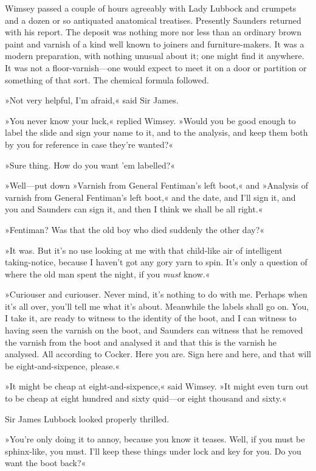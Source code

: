 Wimsey passed a couple of hours agreeably with Lady Lubbock and crumpets and a dozen or so antiquated anatomical treatises. Presently Saunders returned with his report. The deposit was nothing more nor less than an ordinary brown paint and varnish of a kind well known to joiners and furniture-makers. It was a modern preparation, with nothing unusual about it; one might find it anywhere. It was not a floor-varnish—one would expect to meet it on a door or partition or something of that sort. The chemical formula followed.

»Not very helpful, I'm afraid,« said Sir James.

»You never know your luck,« replied Wimsey. »Would you be good enough to label the slide and sign your name to it, and to the analysis, and keep them both by you for reference in case they're wanted?«

»Sure thing. How do you want 'em labelled?«

»Well—put down »Varnish from General Fentiman's left boot,« and »Analysis of varnish from General Fentiman's left boot,« and the date, and I'll sign it, and you and Saunders can sign it, and then I think we shall be all right.«

»Fentiman? Was that the old boy who died suddenly the other day?«

»It was. But it's no use looking at me with that child-like air of intelligent taking-notice, because I haven't got any gory yarn to spin. It's only a question of where the old man spent the night, if you \textit{must} know.«

»Curiouser and curiouser. Never mind, it's nothing to do with me. Perhaps when it's all over, you'll tell me what it's about. Meanwhile the labels shall go on. You, I take it, are ready to witness to the identity of the boot, and I can witness to having seen the varnish on the boot, and Saunders can witness that he removed the varnish from the boot and analysed it and that this is the varnish he analysed. All according to Cocker. Here you are. Sign here and here, and that will be eight-and-sixpence, please.«

»It might be cheap at eight-and-sixpence,« said Wimsey. »It might even turn out to be cheap at eight hundred and sixty quid—or eight thousand and sixty.«

Sir James Lubbock looked properly thrilled.

»You're only doing it to annoy, because you know it teases. Well, if you must be sphinx-like, you must. I'll keep these things under lock and key for you. Do you want the boot back?«

